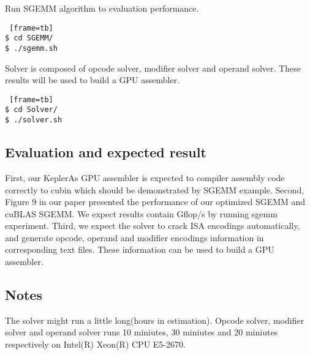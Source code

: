 Run SGEMM algorithm to evaluation performance.
\begin{lstlisting} [frame=tb]
$ cd SGEMM/
$ ./sgemm.sh
\end{lstlisting}

Solver is composed of opcode solver, modifier solver and operand solver. 
These results will be used to build a GPU assembler.
\begin{lstlisting} [frame=tb]
$ cd Solver/
$ ./solver.sh
\end{lstlisting}

\subsection{Evaluation and expected result}
First, our KeplerAs GPU assembler is expected to compiler assembly code correctly to cubin which should be demonstrated by SGEMM example.
Second, Figure $9$ in our paper presented the performance of our optimized SGEMM and cuBLAS SGEMM. We expect results contain Gflop/s by running sgemm experiment. %
Third, we expect the solver to crack ISA encodings automatically, and generate opcode, operand and modifier encodings information in corresponding text files. These information can be used to build a GPU assembler.

\subsection{Notes}
The solver might run a little long(hours in estimation).
Opcode solver, modifier solver and operand solver runs 10 miniutes, 30 miniutes and 20 miniutes respectively on Intel(R) Xeon(R) CPU E5-2670. 

